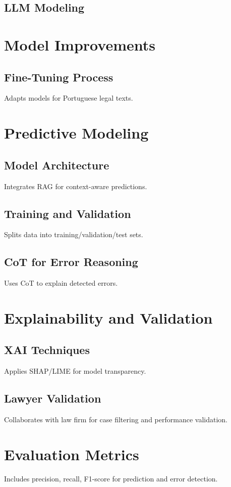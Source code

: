 \documentclass[11pt,a4paper,twoside,openright]{book}
\begin{document}
\subsection{LLM Modeling}

\section{Model Improvements}
\subsection{Fine-Tuning Process}
Adapts models for Portuguese legal texts.
\section{Predictive Modeling}
\subsection{Model Architecture}
Integrates RAG for context-aware predictions.


\subsection{Training and Validation}
Splits data into training/validation/test sets.

\subsection{CoT for Error Reasoning}
Uses CoT to explain detected errors.
\section{Explainability and Validation}
\subsection{XAI Techniques}
Applies SHAP/LIME for model transparency.
\subsection{Lawyer Validation}
Collaborates with law firm for case filtering and performance validation.
\section{Evaluation Metrics}
Includes precision, recall, F1-score for prediction and error detection.
\end{document}
